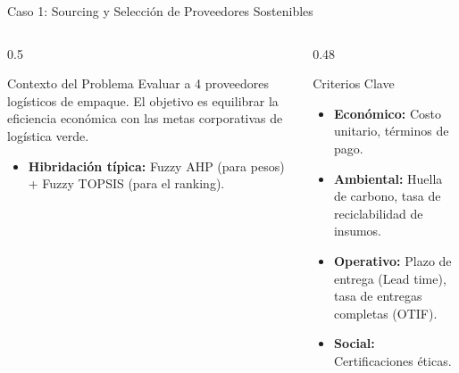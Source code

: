 \documentclass[aspectratio=169, 10pt]{beamer}
\begin{document}
\begin{frame}{Caso 1: Sourcing y Selección de Proveedores Sostenibles}
    \begin{columns}
        \begin{column}{0.5\textwidth}
            \begin{block}{Contexto del Problema}
                Evaluar a 4 proveedores logísticos de empaque. El objetivo es equilibrar la eficiencia económica con las metas corporativas de logística verde.
                \begin{itemize}
                    \item \textbf{Hibridación típica:} Fuzzy AHP (para pesos) + Fuzzy TOPSIS (para el ranking).
                \end{itemize}
            \end{block}
        \end{column}
        
        \begin{column}{0.48\textwidth}
            \begin{exampleblock}{Criterios Clave}
                \begin{itemize}
                    \item \textbf{Económico:} Costo unitario, términos de pago.
                    \item \textbf{Ambiental:} Huella de carbono, tasa de reciclabilidad de insumos.
                    \item \textbf{Operativo:} Plazo de entrega (Lead time), tasa de entregas completas (OTIF).
                    \item \textbf{Social:} Certificaciones éticas.
                \end{itemize}
            \end{exampleblock}
        \end{column}
    \end{columns}
\end{frame}
\end{document}
